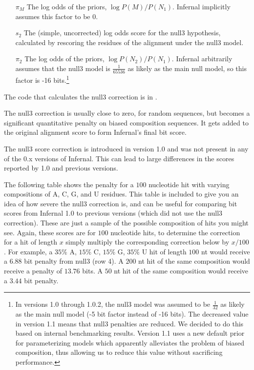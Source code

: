 \begin{sreoutput}
\begin{enumerate}
\item [$\pi_M$] The log odds of the priors, $\log P(M)/P(N_1)$. Infernal
   implicitly assumes this factor to be 0.

\item [$s_2$] The (simple, uncorrected) log odds score
   for the null3 hypothesis, calculated by rescoring the residues
   of the alignment under the null3 model.

\item [$\pi_2$] The log odds of the priors, $\log P(N_2)/P(N_1)$. 
Infernal arbitrarily assumes that the null3 model is
$\frac{1}{65536}$ as likely as the main null model, so this factor
is -16 bits.\footnote{In versions 1.0 through 1.0.2, the null3 model
  was assumed to be $\frac{1}{32}$ as likely as the main null model
  (-5 bit factor instead of -16 bits). The decreased value in version
  1.1 means that null3 penalties are reduced. We decided to do this
  based on internal benchmarking results. Version 1.1 uses a new
  default prior for parameterizing models which apparently alleviates
  the problem of biased composition, thus allowing us to reduce this
  value without sacrificing performance.}
\end{enumerate}

The code that calculates the null3 correction is in 
.

The null3 correction is usually close to zero, for random sequences,
but becomes a significant quantitative penalty on biased composition
sequences.  It gets added to the original alignment score to form
Infernal's final bit score.

The null3 score correction is introduced in version 1.0 and was not
present in any of the 0.x versions of Infernal. This can
lead to large differences in the scores reported by 1.0 and previous
versions. 

The following table shows the penalty for a $100$ nucleotide hit with
varying compositions of A, C, G, and U residues. This table is included to give you
an idea of how severe the null3 correction is, and can be useful for
comparing bit scores from Infernal 1.0 to previous
versions (which did not use the null3 correction). These are just a
sample of the possible composition of hits you might see. Again, these
scores are for $100$ nucleotide hits, to determine the correction for
a hit of length $x$ simply multiply the corresponding correction below
by $x/100$. For example, a $35$\% A, $15$\% C, $15$\% G, $35$\% U hit
of length $100$ nt would receive a $6.88$ bit penalty from
null3 (row 4). A $200$ nt hit of the same composition would
receive a penalty of $13.76$ bits. A $50$ nt hit of the same
composition would receive a $3.44$ bit penalty.


\end{sreoutput}
